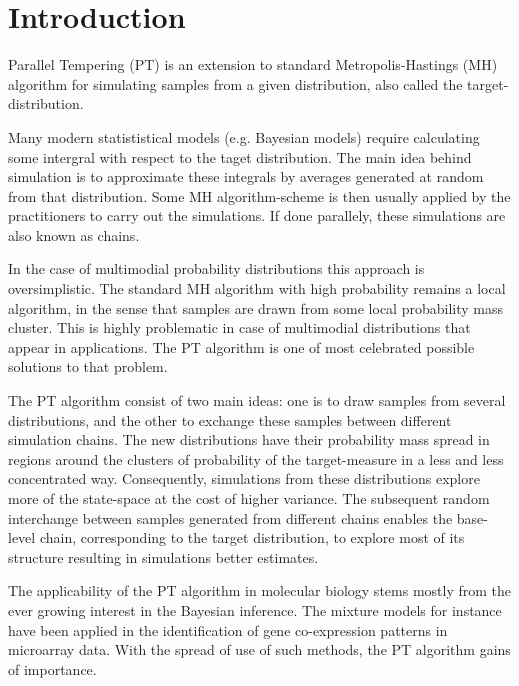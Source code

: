\chapter*{Introduction}


Parallel Tempering (PT) is an extension to standard Metropolis-Hastings (MH) algorithm for simulating samples from a given distribution, also called the target-distribution. 

Many modern statististical models (e.g. Bayesian models) require calculating some intergral with respect to the taget distribution. The main idea behind simulation is to approximate these integrals by averages generated at random from that distribution. Some MH algorithm-scheme is then usually applied by the practitioners to carry out the simulations. If done parallely, these simulations are also known as chains.

In the case of multimodial probability distributions this approach is oversimplistic. The standard MH algorithm with high probability remains a local algorithm, in the sense that samples are drawn from some local probability mass cluster. This is highly problematic in case of multimodial distributions that appear in applications. The PT algorithm is one of most celebrated possible solutions to that problem. 

The PT algorithm consist of two main ideas: one is to draw samples from several distributions, and the other to exchange these samples between different simulation chains. The new distributions have their probability mass spread in regions around the clusters of probability of the target-measure in a less and less concentrated way. Consequently, simulations from these distributions explore more of the state-space at the cost of higher variance. The subsequent random interchange between samples generated from different chains enables the base-level chain, corresponding to the target distribution, to explore most of its structure resulting in simulations better estimates.

The applicability of the PT algorithm in molecular biology stems mostly from the ever growing interest in the Bayesian inference. The mixture models for instance have been applied in the identification of gene co-expression patterns in microarray data. With the spread of use of such methods, the PT algorithm gains of importance.